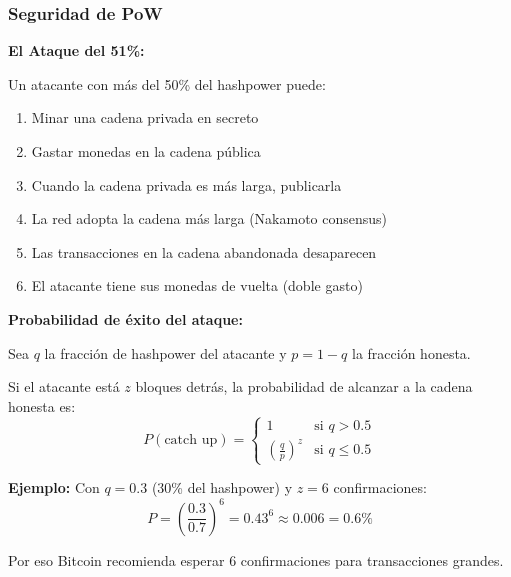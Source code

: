 \documentclass[11pt,a4paper,twoside,openright]{book}
\theoremstyle{definition}
\theoremstyle{plain}
\theoremstyle{remark}
\begin{document}
\begin{center}
\end{center}

\subsubsection{Seguridad de PoW}

\begin{keyidea}
\textbf{El Ataque del 51\%:}

Un atacante con más del 50\% del hashpower puede:
\begin{enumerate}
    \item Minar una cadena privada en secreto
    \item Gastar monedas en la cadena pública
    \item Cuando la cadena privada es más larga, publicarla
    \item La red adopta la cadena más larga (Nakamoto consensus)
    \item Las transacciones en la cadena abandonada desaparecen
    \item El atacante tiene sus monedas de vuelta (doble gasto)
\end{enumerate}
\end{keyidea}

\begin{mathnote}
\textbf{Probabilidad de éxito del ataque:}

Sea $q$ la fracción de hashpower del atacante y $p = 1 - q$ la fracción honesta.

Si el atacante está $z$ bloques detrás, la probabilidad de alcanzar a la cadena honesta es:
\[
P(\text{catch up}) = \begin{cases}
1 & \text{si } q > 0.5 \\
\left(\frac{q}{p}\right)^z & \text{si } q \leq 0.5
\end{cases}
\]

\textbf{Ejemplo:} Con $q = 0.3$ (30\% del hashpower) y $z = 6$ confirmaciones:
\[ P = \left(\frac{0.3}{0.7}\right)^6 = 0.43^6 \approx 0.006 = 0.6\% \]

Por eso Bitcoin recomienda esperar 6 confirmaciones para transacciones grandes.
\end{mathnote}
\end{document}
